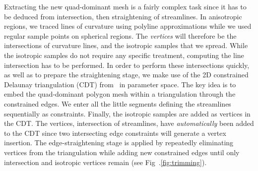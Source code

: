 Extracting the new quad-dominant mesh is a fairly complex task since
it has to be deduced from intersection, then straightening of
streamlines.  In anisotropic regions, we traced lines of curvature
using polyline approximations while we used regular sample points on
spherical regions. The \emph{vertices\/} will therefore be the
intersections of curvature lines, and the isotropic samples that we
spread. While the isotropic samples do not require any specific
treatment, computing the line intersection has to be performed.  In
order to perform these intersections quickly, as well as to prepare
the straightening stage, we make use of the 2D constrained Delaunay
triangulation (CDT) from \cgal\ in parameter space. The key idea is to
embed the quad-dominant polygon mesh within a triangulation through
the constrained edges. We enter all the little segments defining the
streamlines sequentially as constraints.  Finally, the isotropic
samples are added as vertices in the CDT. The vertices, intersection
of streamlines, have \emph{automatically\/} been added to the CDT
since two intersecting edge constraints will generate a vertex
insertion. The edge-straightening stage is applied by repeatedly
eliminating vertices from the triangulation while adding new
constrained edges until only intersection and isotropic vertices
remain (see Fig~.\ref{fig:trimming}).

